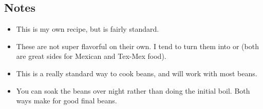 \begin{multicols}{2}
\subsection*{Notes}
\begin{itemize}
    \item This is my own recipe, but is fairly standard.
    \item These are not super flavorful on their own. I tend to turn them into  or  (both are great sides for Mexican and Tex-Mex food).
    \item This is a really standard way to cook beans, and will work with most beans.
    \item You can soak the beans over night rather than doing the initial boil. Both ways make for good final beans.
\end{itemize}
\end{multicols}
\clearpage